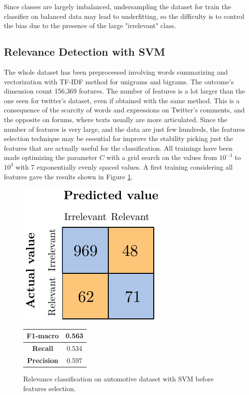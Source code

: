 Since classes are largely imbalanced, undersampling the dataset for train the classifier on balanced data may lead to underfitting, so the difficulty is to control the bias due to the presence of the large "irrelevant" class.



\subsection{Relevance Detection with SVM}

The whole dataset has been preprocessed involving words summarizing and vectorization with TF-IDF method for unigrams and bigrams. The outcome's dimension count 156,369 features. The number of features is a lot larger than the one seen for twitter's dataset, even if obtained with the same method. This is a consequence of the scarcity of words and expressions on Twitter's comments, and the opposite on forums, where texts usually are more articulated. Since the number of features is very large, and the data are just few hundreds, the features selection technique may be essential for improve the stability picking just the features that are actually useful for the classification. All trainings have been made optimizing the parameter $C$ with a grid search on the values from $10^{-3}$ to $10^3$ with 7 exponentially evenly spaced values. A first training considering all features gave the results shown in Figure \ref{fig:ita_rel_svm_bfs}.

\begin{figure}[H]
	\begin{minipage}[b]{0.6\linewidth}
		\centering
		\includegraphics[scale=1]{figures/conf_matrices/ita_rel_svm/ita_rel_svm_bfs.pdf}
	\end{minipage}
	\begin{minipage}[b]{0.3\linewidth}
		\begin{tabular}[b]{ | c | c | } 
			\hline
			\textbf{F1-macro} & 0.563 \\
			\hline
			\textbf{Recall} & 0.534 \\ 
			\hline
			\textbf{Precision} & 0.597 \\ 
			\hline
		\end{tabular}
	\end{minipage}
	\caption{Relevance classification on automotive dataset with SVM before features selection.}
	\label{fig:ita_rel_svm_bfs}
\end{figure}


